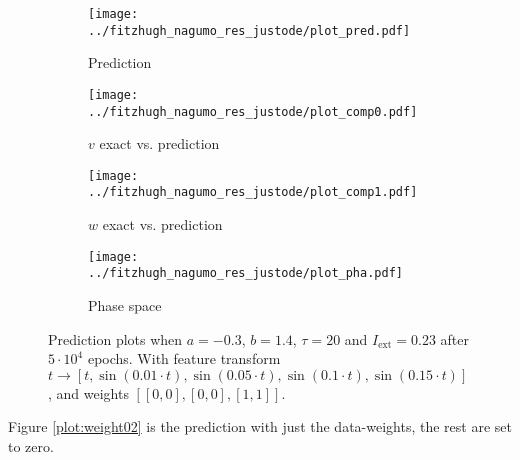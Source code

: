 \documentclass[a4paper]{article}
\begin{document}
\begin{figure}[H]
	\centering 
	\begin{subfigure}[b]{0.47\textwidth}
		\centering
		\texttt{[image: ../fitzhugh\_nagumo\_res\_justode/plot\_pred.pdf]}
		\caption{Prediction}
		\label{fig:weight01a}
	\end{subfigure}
	\begin{subfigure}[b]{0.47\textwidth}
		\centering
		\texttt{[image: ../fitzhugh\_nagumo\_res\_justode/plot\_comp0.pdf]}
		\caption{$v$ exact vs. prediction}
		\label{fig:weight01b}
	\end{subfigure}
	\begin{subfigure}[b]{0.47\textwidth}
		\centering
		\texttt{[image: ../fitzhugh\_nagumo\_res\_justode/plot\_comp1.pdf]}
		\caption{$w$ exact vs. prediction}
		\label{fig:weight01c}
	\end{subfigure}
	\begin{subfigure}[b]{0.47\textwidth}
		\centering
		\texttt{[image: ../fitzhugh\_nagumo\_res\_justode/plot\_pha.pdf]}
		\caption{Phase space}
		\label{fig:weight01d}
	\end{subfigure}
	\caption{Prediction plots when $a=-0.3$, $b=1.4$, $\tau=20$ and $ I_{\text{ext}}=0.23$ after $5\cdot10^4$ epochs. With feature transform $t \rightarrow \left[ t, \sin(0.01 \cdot  t), \sin(0.05 \cdot  t), \sin(0.1 \cdot  t), \sin(0.15 \cdot  t)\right] $, and weights $\left[ \left[ 0, 0\right], \left[ 0, 0\right], \left[ 1, 1\right]\right]$.}
	\label{plot:weight01}
\end{figure} 	

Figure \ref{plot:weight02} is the prediction with just the data-weights, the rest are set to zero.
\end{document}
